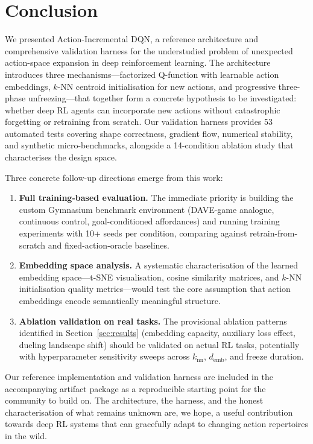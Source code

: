 \documentclass{article}
\begin{document}
\section{Conclusion}
\label{sec:conclusion}

We presented Action-Incremental DQN, a reference architecture and comprehensive validation harness for the understudied problem of unexpected action-space expansion in deep reinforcement learning. The architecture introduces three mechanisms---factorized Q-function with learnable action embeddings, $k$-NN centroid initialisation for new actions, and progressive three-phase unfreezing---that together form a concrete hypothesis to be investigated: whether deep RL agents can incorporate new actions without catastrophic forgetting or retraining from scratch. Our validation harness provides 53 automated tests covering shape correctness, gradient flow, numerical stability, and synthetic micro-benchmarks, alongside a 14-condition ablation study that characterises the design space.

Three concrete follow-up directions emerge from this work:

\begin{enumerate}
  \item \textbf{Full training-based evaluation.} The immediate priority is building the custom Gymnasium benchmark environment (DAVE-game analogue, continuous control, goal-conditioned affordances) and running training experiments with 10+ seeds per condition, comparing against retrain-from-scratch and fixed-action-oracle baselines.
  \item \textbf{Embedding space analysis.} A systematic characterisation of the learned embedding space---t-SNE visualisation, cosine similarity matrices, and $k$-NN initialisation quality metrics---would test the core assumption that action embeddings encode semantically meaningful structure.
  \item \textbf{Ablation validation on real tasks.} The provisional ablation patterns identified in Section~\ref{sec:results} (embedding capacity, auxiliary loss effect, dueling landscape shift) should be validated on actual RL tasks, potentially with hyperparameter sensitivity sweeps across $k_\text{nn}$, $d_\text{emb}$, and freeze duration.
\end{enumerate}

Our reference implementation and validation harness are included in the accompanying artifact package as a reproducible starting point for the community to build on. The architecture, the harness, and the honest characterisation of what remains unknown are, we hope, a useful contribution towards deep RL systems that can gracefully adapt to changing action repertoires in the wild.
\end{document}
